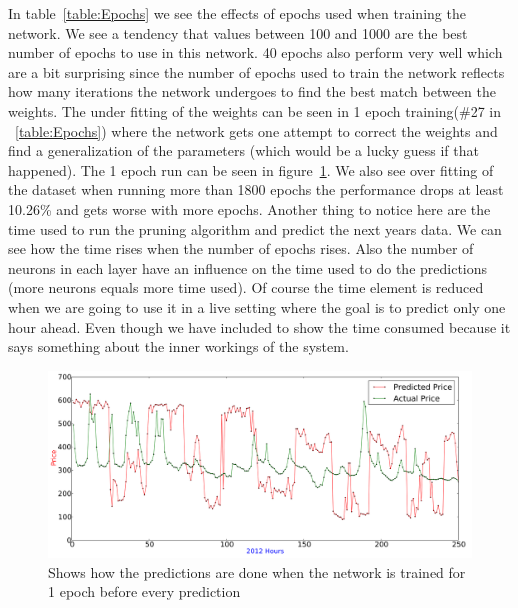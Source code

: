 In table~\ref{table:Epochs} we see the effects of epochs used when training the network. We see a tendency that values between 100 and 1000 are the best number of epochs to use in this network. 40 epochs also perform very well which are a bit surprising since the number of epochs used to train the network reflects how many iterations the network undergoes to find the best match between the weights. The under fitting of the weights can be seen in 1 epoch training(\#27 in ~\ref{table:Epochs}) where the network gets one attempt to correct the weights and find a generalization of the parameters (which would be a lucky guess if that happened). The 1 epoch run can be seen in figure~\ref{fig:1epoch}. We also see over fitting of the dataset when running more than 1800 epochs the performance drops at least 10.26\% and gets worse with more epochs. Another thing to notice here are the time used to run the pruning algorithm and predict the next years data. We can see how the time rises when the number of epochs rises. Also the number of neurons in each layer have an influence on the time used to do the predictions (more neurons equals more time used). Of course the time element is reduced when we are going to use it in a live setting where the goal is to predict only one hour ahead. Even though we have included to show the time consumed because it says something about the inner workings of the system.

\begin{figure}[H]
\centering
\includegraphics[width=\linewidth]{billeder/PriceExperimentalAnalysis/1EpochTraining.png}
\caption{Shows how the predictions are done when the network is trained for 1 epoch before every prediction}
\label{fig:1epoch}
\end{figure}

